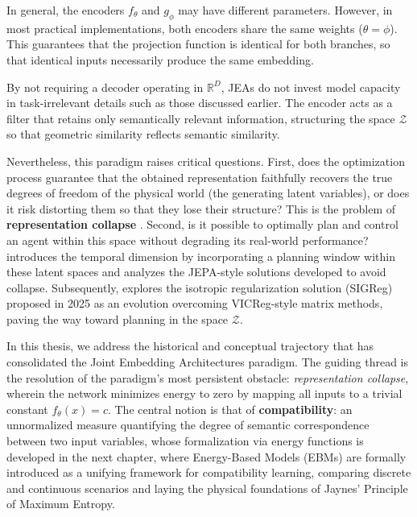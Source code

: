\documentclass[11pt, oneside, openany]{book}
\begin{document}
In general, the encoders $f_{\theta}$ and $g_{\phi}$ may have different parameters. However, in most practical implementations, both encoders share the same weights ($\theta = \phi$). This guarantees that the projection function is identical for both branches, so that identical inputs necessarily produce the same embedding.

By not requiring a decoder operating in $\mathbb{R}^{D}$, JEAs do not invest model capacity in task-irrelevant details such as those discussed earlier. The encoder acts as a filter that retains only semantically relevant information, structuring the space $\mathcal{Z}$ so that geometric similarity reflects semantic similarity.

Nevertheless, this paradigm raises critical questions. First, does the optimization process guarantee that the obtained representation faithfully recovers the true degrees of freedom of the physical world (the generating latent variables), or does it risk distorting them so that they lose their structure? This is the problem of \textbf{representation collapse} \cite{jing2022understanding}. Second, is it possible to optimally plan and control an agent within this space without degrading its real-world performance?  introduces the temporal dimension by incorporating a planning window within these latent spaces and analyzes the JEPA-style solutions developed to avoid collapse. Subsequently,  explores the isotropic regularization solution (SIGReg) proposed in 2025 \cite{balestriero2025lejepa} as an evolution overcoming VICReg-style matrix methods, paving the way toward planning in the space $\mathcal{Z}$.

In this thesis, we address the historical and conceptual trajectory that has consolidated the Joint Embedding Architectures paradigm. The guiding thread is the resolution of the paradigm's most persistent obstacle: \textit{representation collapse}, wherein the network minimizes energy to zero by mapping all inputs to a trivial constant $f_{\theta}(x) = c$. The central notion is that of \textbf{compatibility}: an unnormalized measure quantifying the degree of semantic correspondence between two input variables, whose formalization via energy functions is developed in the next chapter, where Energy-Based Models (EBMs) are formally introduced as a unifying framework for compatibility learning, comparing discrete and continuous scenarios and laying the physical foundations of Jaynes' Principle of Maximum Entropy.

\end{document}
